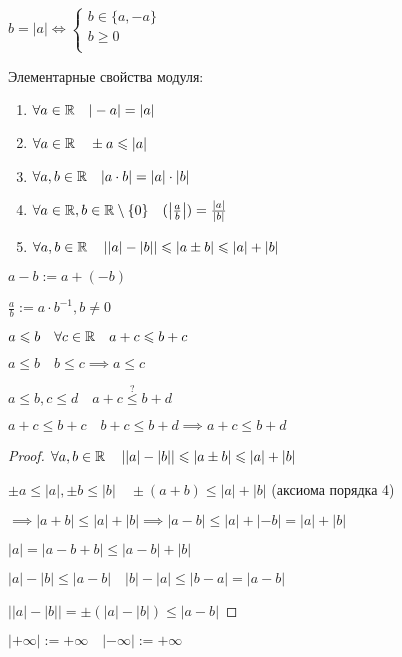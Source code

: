        \begin{property}
            $b=|a| \iff  \begin{cases}
                b\in \{a, -a\}\\
                b\geqslant 0\\
            \end{cases}$
        \end{property}

        Элементарные свойства модуля:
        \begin{enumerate}
            \item $\forall a\in \mathbb{R}\quad |-a| =|a|$
            \item $\forall a\in \mathbb{R}\quad \pm a \leqslant  |a|$
            \item $\forall  a, b\in \mathbb{R}\quad |a\cdot b| = |a|\cdot |b|$
            \item $\forall a\in \mathbb{R}, b\in \mathbb{R}\setminus \{0\}\quad(\left| \frac{a}{b} \right| ) = \frac{|a|}{|b|}$
            \item $\forall a, b\in \mathbb{R}\quad \left| |a| - |b| \right| \leqslant |a\pm b| \leqslant |a|+|b|$
        \end{enumerate}
        \begin{note}
            $a-b := a+(-b)$

            $\frac{a}{b}:= a\cdot b^{-1}, b\neq 0$
        \end{note}
        \begin{note}
            $a\leqslant b\quad\forall c\in \mathbb{R}\quad a+c\leqslant b+c$

            $a\leqslant b\quad b\leqslant c \implies a\leqslant c$

            $a\leqslant b, c\leqslant d\quad a+c\overset{?}{\leqslant} b+d$

            $a+c\leqslant b+c\quad b+c\leqslant b+d \implies a+c\leqslant b+d$
        \end{note}
        \begin{proof}
            $\forall a, b\in \mathbb{R}\quad \left| |a| - |b| \right| \leqslant |a\pm b| \leqslant |a|+|b|$

            $\pm a\leqslant |a|,\pm b\leqslant |b|\quad \pm(a+b)\leqslant |a| + |b| $ (аксиома порядка 4)

            $\implies |a+b|\leqslant |a| + |b| \implies |a-b|\leqslant |a| + |-b| = |a| + |b|$

            $|a| = |a-b+b| \leqslant |a-b| + |b|$

            $|a| - |b|\leqslant |a-b|\quad |b| - |a| \leqslant |b-a| = |a-b|$

            $\left| |a| - |b| \right| =  \pm (|a| - |b|) \leqslant |a-b|$
        \end{proof}
        \begin{note}
            $|+\infty | := +\infty \quad |-\infty | := +\infty $
        \end{note}

